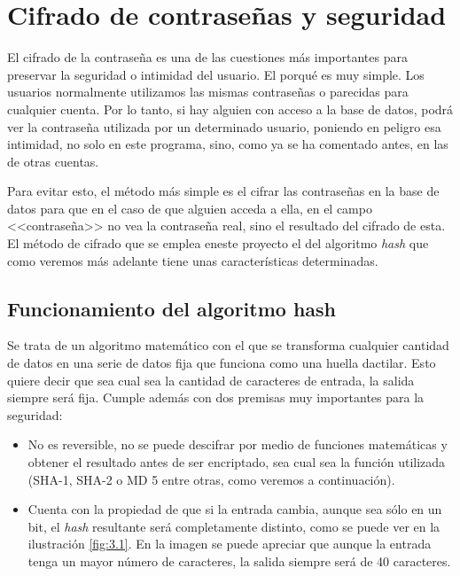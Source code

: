 \section{Cifrado de contraseñas y seguridad}

El cifrado de la contraseña es una de las cuestiones más importantes para preservar la seguridad o intimidad del usuario. El porqué es muy simple. Los usuarios normalmente utilizamos las mismas contraseñas o parecidas para cualquier cuenta. Por lo tanto, si hay alguien con acceso a la base de datos, podrá ver la contraseña utilizada por un determinado usuario, poniendo en peligro esa intimidad, no solo en este programa, sino, como ya se ha comentado antes, en las de otras cuentas.

Para evitar esto, el método más simple es el cifrar las contraseñas en la base de datos para que en el caso de que alguien acceda a ella, en el campo <<contraseña>> no vea la contraseña real, sino el resultado del cifrado de esta. El método de cifrado que se emplea eneste proyecto el del algoritmo \emph{hash} que como veremos más adelante tiene unas características determinadas. 

\subsection{Funcionamiento del algoritmo hash}

Se trata de un algoritmo matemático con el que se transforma cualquier cantidad de datos en una serie de datos fija que funciona como una huella dactilar. Esto quiere decir que sea cual sea la cantidad de caracteres de entrada, la salida siempre será fija. Cumple además con dos premisas muy importantes para la seguridad: 

\begin{itemize}
\item No es reversible, no se puede descifrar por medio de funciones matemáticas y obtener el resultado antes de ser encriptado, sea cual sea la función utilizada (SHA-1, SHA-2 o MD 5 entre otras, como veremos a continuación).
\item Cuenta con la propiedad de que si la entrada cambia, aunque sea sólo en un bit, el \emph{hash} resultante será completamente distinto, como se puede ver en la ilustración \ref{fig:3.1}. En la imagen se puede apreciar que aunque la entrada tenga un mayor número de caracteres, la salida siempre será de 40 caracteres.

\end{itemize} 

